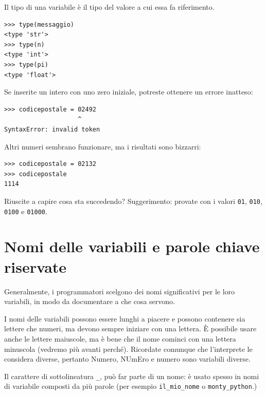 \documentclass[10pt]{book}
\begin{document}
Il tipo di una variabile è il tipo del valore a cui essa fa riferimento.

\begin{verbatim}
>>> type(messaggio)
<type 'str'>
>>> type(n)
<type 'int'>
>>> type(pi)
<type 'float'>
\end{verbatim}

\vspace{0.2in}
\begin{exercise}

Se inserite un intero con uno zero iniziale, potreste ottenere un errore inatteso:

\begin{verbatim}
>>> codicepostale = 02492
                    ^
SyntaxError: invalid token
\end{verbatim}

Altri numeri sembrano funzionare, ma i risultati sono bizzarri:

\begin{verbatim}
>>> codicepostale = 02132
>>> codicepostale
1114
\end{verbatim}

Riuscite a capire cosa sta succedendo? Suggerimento: provate con i valori
 {\tt 01}, {\tt 010}, {\tt 0100} e {\tt 01000}.

\end{exercise}



\section{Nomi delle variabili e parole chiave riservate}

Generalmente, i programmatori scelgono dei nomi significativi per le loro variabili, in modo da documentare a che cosa servono.

I nomi delle variabili possono essere lunghi a piacere e possono contenere sia lettere che numeri, ma devono sempre iniziare con una lettera. È possibile usare anche le lettere maiuscole, ma è bene che il nome cominci con una lettera minuscola (vedremo più avanti perché). Ricordate comunque che l'interprete le considera diverse, pertanto Numero, NUmEro e numero sono variabili diverse.

Il carattere di sottolineatura \verb"_", può far parte di un nome: è usato spesso in nomi di variabile composti da più parole (per esempio 
\verb"il_mio_nome" o \verb"monty_python".)
\end{document}
